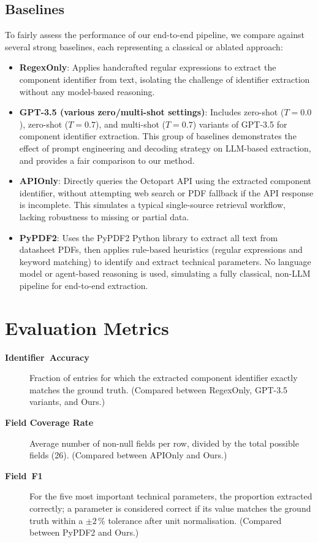 \subsection{Baselines}
To fairly assess the performance of our end-to-end pipeline, we compare against several strong baselines, each representing a classical or ablated approach:
\begin{itemize}
  \item \textbf{RegexOnly}: Applies handcrafted regular expressions to extract the component identifier from text, isolating the challenge of identifier extraction without any model-based reasoning.
  \item \textbf{GPT-3.5 (various zero/multi-shot settings)}: Includes zero-shot ($T=0.0$), zero-shot ($T=0.7$), and multi-shot ($T=0.7$) variants of GPT-3.5 for component identifier extraction. This group of baselines demonstrates the effect of prompt engineering and decoding strategy on LLM-based extraction, and provides a fair comparison to our method.
  \item \textbf{APIOnly}: Directly queries the Octopart API using the extracted component identifier, without attempting web search or PDF fallback if the API response is incomplete. This simulates a typical single-source retrieval workflow, lacking robustness to missing or partial data.
  \item \textbf{PyPDF2}: Uses the PyPDF2 Python library to extract all text from datasheet PDFs, then applies rule-based heuristics (regular expressions and keyword matching) to identify and extract technical parameters. No language model or agent-based reasoning is used, simulating a fully classical, non-LLM pipeline for end-to-end extraction.
\end{itemize}

\section{Evaluation Metrics}
\begin{description}
  \item[\textbf{Identifier~Accuracy}] Fraction of entries for which the extracted component identifier exactly matches the ground truth. (Compared between RegexOnly, GPT-3.5 variants, and Ours.)
  \item[\textbf{Field Coverage Rate}] Average number of non-null fields per row, divided by the total possible fields (26). (Compared between APIOnly and Ours.)
  \item[\textbf{Field~F1}] For the five most important technical parameters, the proportion extracted correctly; a parameter is considered correct if its value matches the ground truth within a $\pm2\,\%$ tolerance after unit normalisation. (Compared between PyPDF2 and Ours.)
\end{description}


